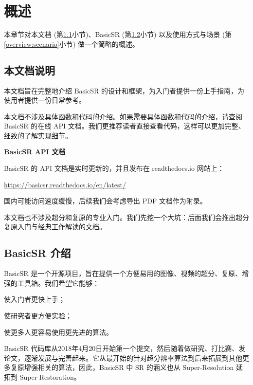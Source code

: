 \documentclass[../main.tex]{subfiles}
\begin{document}
\chapter{概述}
\vspace{-2cm}

本章节对本文档 (第\ref{overview:docs-intro}小节)、BasicSR (第\ref{overview:basicsr-intro}小节) 以及使用方式与场景 (第\ref{overview:scenario}小节) 做一个简略的概述。

\section{本文档说明}\label{overview:docs-intro}

本文档旨在完整地介绍 BasicSR 的设计和框架，为入门者提供一份上手指南，为使用者提供一份日常参考。

本文档不涉及具体函数和代码的介绍。如果需要具体函数和代码的介绍，请查阅 BasicSR 的在线 API 文档。我们更推荐读者直接查看代码，这样可以更加完整、细致的了解实现细节。

\begin{hl} %
    \textbf{BasicSR API 文档}

    BasicSR 的 API 文档是实时更新的，并且发布在 readthedocs.io 网站上：

    \url{https://basicsr.readthedocs.io/en/latest/}

    国内可能访问速度缓慢，后续我们会考虑导出 PDF 文档作为附录。
\end{hl}

本文档也不涉及超分和复原的专业入门。我们先挖一个大坑：后面我们会推出超分复原入门与经典工作解读的文档。

\section{BasicSR 介绍}\label{overview:basicsr-intro}

BasicSR 是一个开源项目，旨在提供一个方便易用的图像、视频的超分、复原、增强的工具箱。我们希望它能够：

\centerline{使入门者更快上手；}
\centerline{使研究者更方便实验；}
\centerline{使更多人更容易使用更先进的算法。}

BasicSR 代码库从2018年4月20日开始第一个提交，然后随着做研究、打比赛、发论文，逐渐发展与完善起来。它从最开始的针对超分辨率算法到后来拓展到其他更多复原增强相关的算法，因此，BasicSR 中 SR 的涵义也从 Super-Resolution 延拓到 Super-Restoration。
\end{document}
